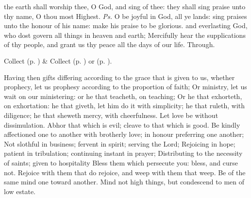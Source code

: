 \introit
{} the earth shall worship thee, O God, and sing of thee: they shall sing praise unto thy name, O thou most Highest. \textit{Ps.} O be joyful in God, all ye lands: sing praises unto the honour of his name: make his praise to be glorious.
\collect\label{EpiphanyIICollect}
 and everlasting God, who dost govern all things in heaven and earth; Mercifully hear the supplications of thy people, and grant us thy peace all the days of our life. Through.
\begin{rubric}
     Collect  (p. \pageref{SPMaryPostChristmas}) \&  Collect  (p. \pageref{SPAgainst}) or  (p. \pageref{SPChiefBishop}).
\end{rubric}
 Having then gifts differing according to the grace that is given to us, whether prophecy, let us prophesy according to the proportion of faith; Or ministry, let us wait on our ministering: or he that teacheth, on teaching; Or he that exhorteth, on exhortation: he that giveth, let him do it with simplicity; he that ruleth, with diligence; he that sheweth mercy, with cheerfulness. Let love be without dissimulation. Abhor that which is evil; cleave to that which is good. Be kindly affectioned one to another with brotherly love; in honour preferring one another; Not slothful in business; fervent in spirit; serving the Lord; Rejoicing in hope; patient in tribulation; continuing instant in prayer; Distributing to the necessity of saints; given to hospitality Bless them which persecute you: bless, and curse not. Rejoice with them that do rejoice, and weep with them that weep. Be of the same mind one toward another. Mind not high things, but condescend to men of low estate.

